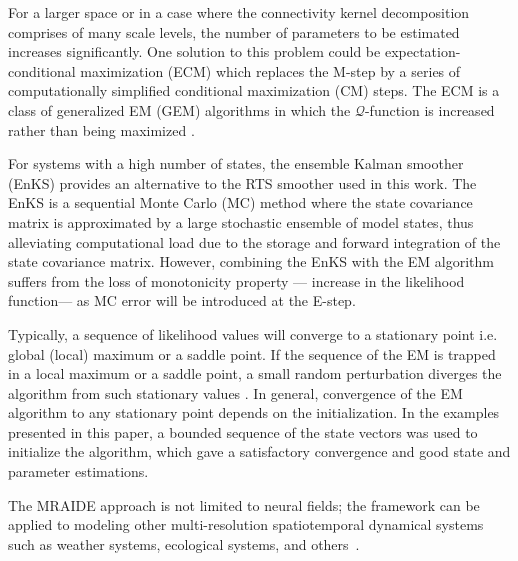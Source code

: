 \documentclass[review,authoryear,3p]{elsarticle}
\newcommand{\parham}[1]{\textcolor{red}{#1}}
\begin{document}
For a larger space or in a case where the connectivity kernel decomposition comprises of  many scale levels, the number of parameters to be estimated increases significantly. One solution to this problem could be expectation-conditional maximization (ECM) \citep{Meng1993,Meng1994} which replaces the M-step by a series of computationally simplified conditional maximization (CM) steps. The ECM is a class of generalized EM (GEM)  algorithms in which the $\mathcal{Q}$-function is increased rather than being maximized \citep{Fessler1994}. 

For systems with a high number of states, the ensemble Kalman smoother (EnKS) \citep{Evensen2003,Evensen2009a,Evensen2009} provides an alternative to the RTS smoother used in this work. The EnKS is a sequential Monte Carlo (MC) method where the state covariance matrix is approximated by a large stochastic ensemble of model states, thus alleviating computational load due to the storage and forward integration of the state covariance matrix. However, combining the EnKS with the EM algorithm suffers from the loss of monotonicity property --- increase in the likelihood function--- as MC error will be introduced at the E-step.

Typically, a sequence of likelihood values will converge to a stationary point i.e. global (local) maximum or a saddle point. If the sequence of the EM is trapped in a local maximum or a saddle point, a small random perturbation diverges the algorithm from such stationary values \citep{McLachlan1997}. In general, convergence of the EM algorithm to any stationary point depends on the initialization. In the examples presented in this paper, a bounded sequence of the state vectors was used to initialize the algorithm, which gave a satisfactory convergence and good state and parameter estimations.


The MRAIDE approach is not limited to neural fields; the framework can be applied to modeling other multi-resolution spatiotemporal dynamical systems such as weather systems, ecological systems, and others~\citep{Wikle2002,Xu2005}. 
\end{document}
